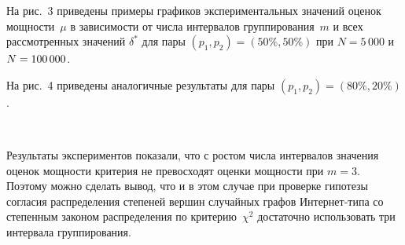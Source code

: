 \begin{multicols}{2}
На рис.~3 приведены примеры графиков экспериментальных значений
оценок мощности~$\mu$ в зависимости от числа интервалов
группирования~$m$ и всех рассмотренных значений $\delta^*$ для
пары $(p_1,p_2)=(50\%,50\%)$ при $N= 5\,000$ и $N\hm =
100\,000$.



На рис.~4 приведены аналогичные результаты для пары
$(p_1,p_2)=(80\%,20\%)$.

\begin{figure*} %
\vspace*{1pt}
\begin{center}
\mbox{%
\epsfxsize=164.399mm
}
\end{center}
\vspace*{-6pt}
\vspace*{9pt}
\end{figure*}


Результаты экспериментов показали, что с рос\-том числа интервалов
значения оценок мощности критерия не превосходят оценки мощности
при $m=3$. Поэтому можно сделать вывод, что и в этом случае при
проверке гипотезы согласия распределения степеней вершин
случайных графов Ин\-тер\-нет-ти\-па со степенным законом распределения
по критерию~$\chi^2$ достаточно использовать три интервала
группирования.


\end{multicols}
